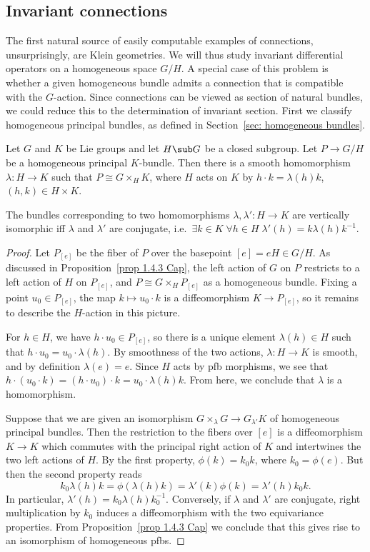 \subsection{Invariant connections}

The first natural source of easily computable examples of connections, unsurprisingly, are Klein geometries. We will thus study invariant differential operators on a homogeneous space $G\slash H$. A special case of this problem is whether a given homogeneous bundle admits a connection that is compatible with the $G$-action. Since connections can be viewed as section of natural bundles, we could reduce this to the determination of invariant section. First we classify homogeneous principal bundles, as defined in Section~\ref{sec: homogeneous bundles}.

\begin{lem}\label{lem 1.4.5 Cap}
    Let $G$ and $K$ be Lie groups and let $H\sub G$ be a closed subgroup. Let $P\to G\slash H$ be a homogeneous principal $K$-bundle. Then there is a smooth homomorphism $\lambda:H\to K$ such that $P\cong G\times_H K$, where $H$ acts on $K$ by $h\cdot k=\lambda(h)k$, $(h,k)\in H\times K$.

    The bundles corresponding to two homomorphisms $\lambda,\lambda':H\to K$ are vertically isomorphic iff $\lambda$ and $\lambda'$ are conjugate, i.e.\ $\exists k\in K\;\forall h\in H \; \lambda'(h)=k\lambda(h)k^{-1}$.
\end{lem}
\begin{proof}
    Let $P_{[e]}$ be the fiber of $P$ over the basepoint $[e]=eH\in G\slash H$. As discussed in Proposition~\ref{prop 1.4.3 Cap}, the left action of $G$ on $P$ restricts to a left action of $H$ on $P_{[e]}$, and $P\cong G\times_H P_{[e]}$ as a homogeneous bundle. Fixing a point $u_0\in P_{[e]}$, the map $k\mapsto u_0\cdot k$ is a diffeomorphism $K\to P_{[e]}$, so it remains to describe the $H$-action in this picture.

    For $h\in H$, we have $h\cdot u_0\in P_{[e]}$, so there is a unique element $\lambda(h)\in H$ such that $h\cdot u_0=u_0\cdot\lambda(h)$. By smoothness of the two actions, $\lambda:H\to K$ is smooth, and by definition $\lambda(e)=e$. Since $H$ acts by \gls{pfb} morphisms, we see that $h\cdot(u_0\cdot k)=(h\cdot u_0)\cdot k=u_0\cdot \lambda(h)k$. From here, we conclude that $\lambda$ is a homomorphism.

    Suppose that we are given an isomorphism $G\times_{\lambda} G\to G_{\lambda'}K$ of homogeneous principal bundles. Then the restriction to the fibers over $[e]$ is a diffeomorphism $K\to K$ which commutes with the principal right action of $K$ and intertwines the two left actions of $H$. By the first property, $\phi(k)=k_0k$, where $k_0=\phi(e)$. But then the second property reads 
    \[k_0\lambda(h)k=\phi(\lambda(h)k)=\lambda'(k)\phi(k)=\lambda'(h)k_0k.\]
    In particular, $\lambda'(h)=k_0\lambda(h)k_0^{-1}$. Conversely, if $\lambda$ and $\lambda'$ are conjugate, right multiplication by $k_0$ induces a diffeomorphism with the two equivariance properties. From Proposition~\ref{prop 1.4.3 Cap} we conclude that this gives rise to an isomorphism of homogeneous \glspl{pfb}.
\end{proof}

